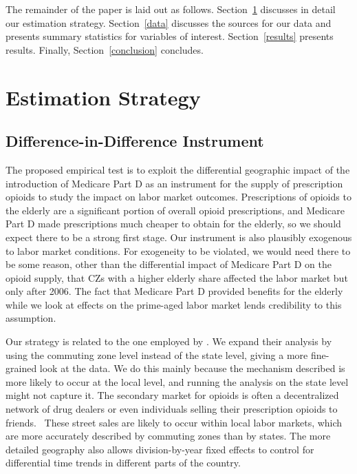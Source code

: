 \documentclass[12pt]{article}
\begin{document}
The remainder of the paper is laid out as follows.  Section~\ref{estimation} discusses in detail our estimation strategy.  Section~\ref{data} discusses the sources for our data and presents summary statistics for variables of interest.  Section~\ref{results} presents results.  Finally, Section~\ref{conclusion} concludes.

\section{Estimation Strategy} \label{estimation}
\subsection{Difference-in-Difference Instrument}
The proposed empirical test is to exploit the differential geographic impact of the introduction of Medicare Part D as an instrument for the supply of prescription opioids to study the impact on labor market outcomes.  Prescriptions of opioids to the elderly are a significant portion of overall opioid prescriptions, 
and Medicare Part D made prescriptions much cheaper to obtain for the elderly, so we should expect there to be a strong first stage.  Our instrument is also plausibly exogenous to labor market conditions.  For exogeneity to be violated, we would need there to be some reason, other than the differential impact of Medicare Part D on the opioid supply, that CZs with a higher elderly share affected the labor market but only after 2006.  The fact that Medicare Part D provided benefits for the elderly while we look at effects on the prime-aged labor market lends credibility to this assumption.

Our strategy is related to the one employed by \textcite{powell15}.  We expand their analysis by using the commuting zone level instead of the state level, giving a more fine-grained look at the data.  We do this mainly because the mechanism described is more likely to occur at the local level, and running the analysis on the state level might not capture it.  The secondary market for opioids is often a decentralized network of drug dealers or even individuals selling their prescription opioids to friends.~  These street sales are likely to occur within local labor markets, which are more accurately described by commuting zones than by states.  The more detailed geography also allows division-by-year fixed effects to control for differential time trends in different parts of the country.
\end{document}

